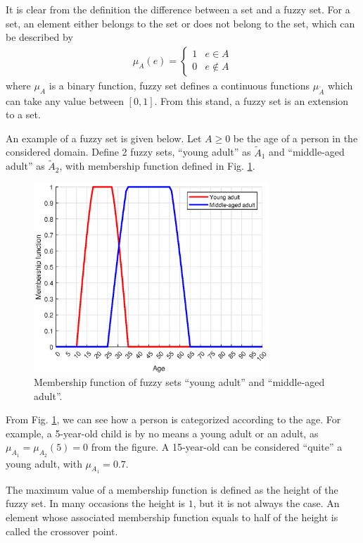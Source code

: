 It is clear from the definition the difference between a set and a fuzzy set. For a set, an element either belongs to the set or does not belong to the set, which can be described by
\begin{eqnarray}
	\mu_{A}(e) = \left\{\begin{array}{cc}
		1 & e \in A \\
		0 & e \notin A
	\end{array}\right. \nonumber
\end{eqnarray}
where $\mu_{A}$ is a binary function, fuzzy set defines a continuous functions $\mu_{\tilde{A}}$ which can take any value between $[0,1]$. From this stand, a fuzzy set is an extension to a set.

An example of a fuzzy set is given below. Let $A\geq 0$ be the age of a person in the considered domain. Define 2 fuzzy sets, ``young adult'' as $\tilde{A}_1$ and ``middle-aged adult'' as $\tilde{A}_2$, with membership function defined in Fig. \ref{ch:fcs:fig:fuzzysetexp}.

\begin{figure}
	\centering
	\includegraphics[width=250pt]{chapters/ch-fuzzy-control-system/figures/fuzzysetexp.eps}
	\caption{Membership function of fuzzy sets ``young adult'' and ``middle-aged adult''.} \label{ch:fcs:fig:fuzzysetexp}
\end{figure}

From Fig. \ref{ch:fcs:fig:fuzzysetexp}, we can see how a person is categorized according to the age. For example, a 5-year-old child is by no means a young adult or an adult, as $\mu_{A_1}=\mu_{A_2}(5)=0$ from the figure. A 15-year-old can be considered ``quite'' a young adult, with $\mu_{A_1}=0.7$.

The maximum value of a membership function is defined as the height of the fuzzy set. In many occasions the height is $1$, but it is not always the case. An element whose associated membership function equals to half of the height is called the crossover point.

